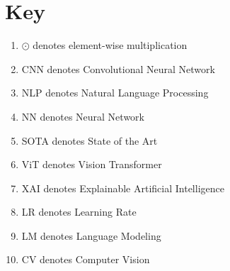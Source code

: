 \chapter*{Key}

\begin{enumerate}
    \item $\odot$ denotes element-wise multiplication
    \item CNN denotes Convolutional Neural Network
    \item NLP denotes Natural Language Processing
    \item NN denotes Neural Network
    \item SOTA denotes State of the Art
    \item ViT denotes Vision Transformer
    \item XAI denotes Explainable Artificial Intelligence
    \item LR denotes Learning Rate
    \item LM denotes Language Modeling
    \item CV denotes Computer Vision
\end{enumerate}